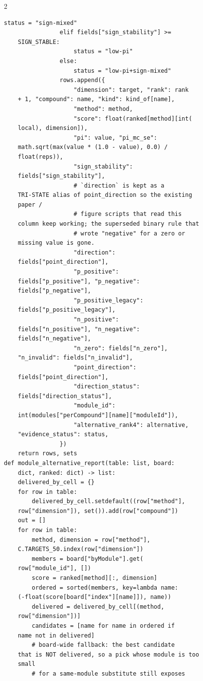 \begin{multicols}{2}
\begin{Verbatim}[fontsize=\scriptsize]
                    status = "sign-mixed"
                elif fields["sign_stability"] >=
    SIGN_STABLE:
                    status = "low-pi"
                else:
                    status = "low-pi+sign-mixed"
                rows.append({
                    "dimension": target, "rank": rank
    + 1, "compound": name, "kind": kind_of[name],
                    "method": method,
                    "score": float(ranked[method][int(
    local), dimension]),
                    "pi": value, "pi_mc_se":
    math.sqrt(max(value * (1.0 - value), 0.0) /
    float(reps)),
                    "sign_stability":
    fields["sign_stability"],
                    # `direction` is kept as a
    TRI-STATE alias of point_direction so the existing
    paper /
                    # figure scripts that read this
    column keep working; the superseded binary rule that
                    # wrote "negative" for a zero or
    missing value is gone.
                    "direction":
    fields["point_direction"],
                    "p_positive":
    fields["p_positive"], "p_negative":
    fields["p_negative"],
                    "p_positive_legacy":
    fields["p_positive_legacy"],
                    "n_positive":
    fields["n_positive"], "n_negative":
    fields["n_negative"],
                    "n_zero": fields["n_zero"],
    "n_invalid": fields["n_invalid"],
                    "point_direction":
    fields["point_direction"],
                    "direction_status":
    fields["direction_status"],
                    "module_id":
    int(modules["perCompound"][name]["moduleId"]),
                    "alternative_rank4": alternative,
    "evidence_status": status,
                })
    return rows, sets
def module_alternative_report(table: list, board:
    dict, ranked: dict) -> list:
    delivered_by_cell = {}
    for row in table:
        delivered_by_cell.setdefault((row["method"],
    row["dimension"]), set()).add(row["compound"])
    out = []
    for row in table:
        method, dimension = row["method"],
    C.TARGETS_50.index(row["dimension"])
        members = board["byModule"].get(
    row["module_id"], [])
        score = ranked[method][:, dimension]
        ordered = sorted(members, key=lambda name:
    (-float(score[board["index"][name]]), name))
        delivered = delivered_by_cell[(method,
    row["dimension"])]
        candidates = [name for name in ordered if
    name not in delivered]
        # board-wide fallback: the best candidate
    that is NOT delivered, so a pick whose module is too
    small
        # for a same-module substitute still exposes

\end{Verbatim}
\end{multicols}
